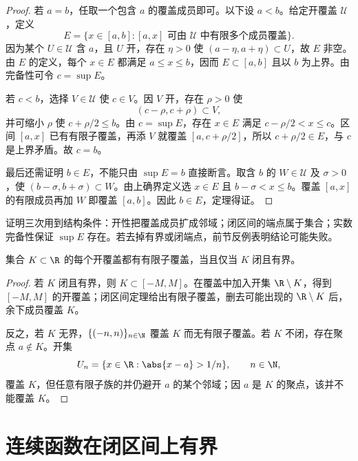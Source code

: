 \begin{proof}
若 \(a=b\)，任取一个包含 \(a\) 的覆盖成员即可。以下设 \(a<b\)。给定开覆盖 \(\mathcal U\)，定义
\[
 E=\{x\in[a,b]:[a,x]\text{ 可由 }\mathcal U
 \text{ 中有限多个成员覆盖}\}.
\]
因为某个 \(U\in\mathcal U\) 含 \(a\)，且 \(U\) 开，存在 \(\eta>0\) 使
\((a-\eta,a+\eta)\subset U\)，故 \(E\) 非空。由 \(E\) 的定义，每个 \(x\in E\) 都满足 \(a\le x\le b\)，因而 \(E\subset[a,b]\) 且以 \(b\) 为上界。由完备性可令 \(c=\sup E\)。

若 \(c<b\)，选择 \(V\in\mathcal U\) 使 \(c\in V\)。因 \(V\) 开，存在 \(\rho>0\) 使
\[
 (c-\rho,c+\rho)\subset V,
\]
并可缩小 \(\rho\) 使 \(c+\rho/2\le b\)。由 \(c=\sup E\)，存在 \(x\in E\) 满足 \(c-\rho/2<x\le c\)。区间 \([a,x]\) 已有有限子覆盖，再添 \(V\) 就覆盖 \([a,c+\rho/2]\)，所以 \(c+\rho/2\in E\)，与 \(c\) 是上界矛盾。故 \(c=b\)。

最后还需证明 \(b\in E\)，不能只由 \(\sup E=b\) 直接断言。取含 \(b\) 的 \(W\in\mathcal U\) 及 \(\sigma>0\)，使 \((b-\sigma,b+\sigma)\subset W\)。由上确界定义选 \(x\in E\) 且 \(b-\sigma<x\le b\)。覆盖 \([a,x]\) 的有限成员再加 \(W\) 即覆盖 \([a,b]\)。因此 \(b\in E\)，定理得证。
\end{proof}

\begin{remark}
证明三次用到结构条件：开性把覆盖成员扩成邻域；闭区间的端点属于集合；实数完备性保证 \(\sup E\) 存在。若去掉有界或闭端点，前节反例表明结论可能失败。
\end{remark}

\begin{theorem}
集合 \(K\subset\R\) 的每个开覆盖都有有限子覆盖，当且仅当 \(K\) 闭且有界。
\end{theorem}

\begin{proof}
若 \(K\) 闭且有界，则 \(K\subset[-M,M]\)。在覆盖中加入开集 \(\R\setminus K\)，得到 \([-M,M]\) 的开覆盖；闭区间定理给出有限子覆盖，删去可能出现的 \(\R\setminus K\) 后，余下成员覆盖 \(K\)。

反之，若 \(K\) 无界，\(\{(-n,n)\}_{n\in\N}\) 覆盖 \(K\) 而无有限子覆盖。若 \(K\) 不闭，存在聚点 \(a\notin K\)。开集
\[
 U_n=\{x\in\R:\abs{x-a}>1/n\},\qquad n\in\N,
\]
覆盖 \(K\)，但任意有限子族的并仍避开 \(a\) 的某个邻域；因 \(a\) 是 \(K\) 的聚点，该并不能覆盖 \(K\)。
\end{proof}

\section{连续函数在闭区间上有界}

